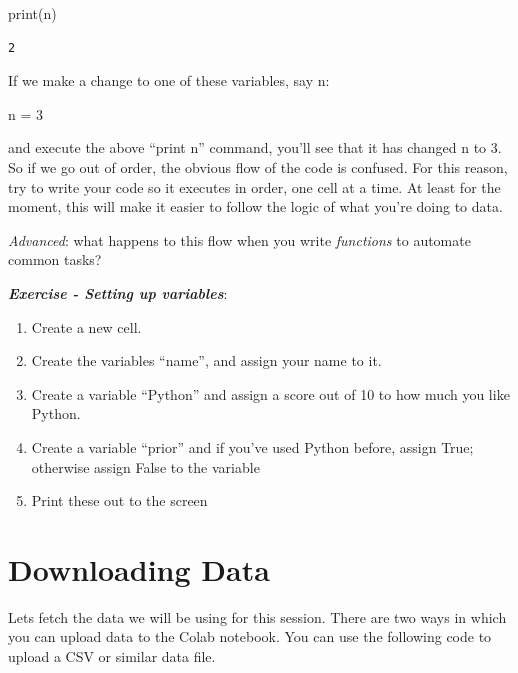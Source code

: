 \documentclass[
  letterpaper,
  DIV=11,
  numbers=noendperiod]{scrreprt}
\newenvironment{Shaded}{\begin{snugshade}}{\end{snugshade}}
\newcommand{\BuiltInTok}[1]{\textcolor[rgb]{0.00,0.23,0.31}{#1}}
\newcommand{\DecValTok}[1]{\textcolor[rgb]{0.68,0.00,0.00}{#1}}
\newcommand{\NormalTok}[1]{\textcolor[rgb]{0.00,0.23,0.31}{#1}}
\newcommand{\OperatorTok}[1]{\textcolor[rgb]{0.37,0.37,0.37}{#1}}
\begin{document}
\begin{Shaded}
\begin{Highlighting}[]
\BuiltInTok{print}\NormalTok{(n)}
\end{Highlighting}
\end{Shaded}

\begin{verbatim}
2
\end{verbatim}

If we make a change to one of these variables, say n:

\begin{Shaded}
\begin{Highlighting}[]
\NormalTok{n }\OperatorTok{=} \DecValTok{3}
\end{Highlighting}
\end{Shaded}

and execute the above ``print n'' command, you'll see that it has
changed n to 3. So if we go out of order, the obvious flow of the code
is confused. For this reason, try to write your code so it executes in
order, one cell at a time. At least for the moment, this will make it
easier to follow the logic of what you're doing to data.

\emph{Advanced}: what happens to this flow when you write
\emph{functions} to automate common tasks?

\textbf{\emph{Exercise - Setting up variables}}:

\begin{enumerate}
\def\labelenumi{\arabic{enumi}.}
\item
  Create a new cell.
\item
  Create the variables ``name'', and assign your name to it.
\item
  Create a variable ``Python'' and assign a score out of 10 to how much
  you like Python.
\item
  Create a variable ``prior'' and if you've used Python before, assign
  True; otherwise assign False to the variable
\item
  Print these out to the screen
\end{enumerate}

\hypertarget{downloading-data}{%
\section{Downloading Data}\label{downloading-data}}

Lets fetch the data we will be using for this session. There are two
ways in which you can upload data to the Colab notebook. You can use the
following code to upload a CSV or similar data file.
\end{document}
